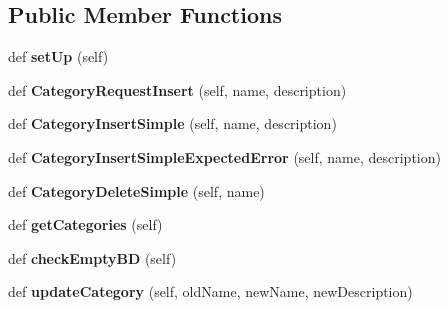 \subsection*{Public Member Functions}
\begin{DoxyCompactItemize}
\item 
def {\bfseries set\+Up} (self)\hypertarget{classRestAPITest_1_1TestCase_ab15a63e1cef5742168755c914f15d523}{}\label{classRestAPITest_1_1TestCase_ab15a63e1cef5742168755c914f15d523}

\item 
def {\bfseries Category\+Request\+Insert} (self, name, description)\hypertarget{classRestAPITest_1_1TestCase_a969723a3a0b1e8c53826b8b66d381ecf}{}\label{classRestAPITest_1_1TestCase_a969723a3a0b1e8c53826b8b66d381ecf}

\item 
def {\bfseries Category\+Insert\+Simple} (self, name, description)\hypertarget{classRestAPITest_1_1TestCase_a4577b04619521115a7fe7beabd2cc4c6}{}\label{classRestAPITest_1_1TestCase_a4577b04619521115a7fe7beabd2cc4c6}

\item 
def {\bfseries Category\+Insert\+Simple\+Expected\+Error} (self, name, description)\hypertarget{classRestAPITest_1_1TestCase_a7eaacb4d1cadafd86a3796c853b910b3}{}\label{classRestAPITest_1_1TestCase_a7eaacb4d1cadafd86a3796c853b910b3}

\item 
def {\bfseries Category\+Delete\+Simple} (self, name)\hypertarget{classRestAPITest_1_1TestCase_a10dfd5e51c8ac3153dd27efba4a6fd44}{}\label{classRestAPITest_1_1TestCase_a10dfd5e51c8ac3153dd27efba4a6fd44}

\item 
def {\bfseries get\+Categories} (self)\hypertarget{classRestAPITest_1_1TestCase_a3b0f3e34610c37926b3aba29263215c3}{}\label{classRestAPITest_1_1TestCase_a3b0f3e34610c37926b3aba29263215c3}

\item 
def {\bfseries check\+Empty\+BD} (self)\hypertarget{classRestAPITest_1_1TestCase_abf0c80f731366e0ea26dffc40a37c2c5}{}\label{classRestAPITest_1_1TestCase_abf0c80f731366e0ea26dffc40a37c2c5}

\item 
def {\bfseries update\+Category} (self, old\+Name, new\+Name, new\+Description)\hypertarget{classRestAPITest_1_1TestCase_a3288d417eff8aa893b604e06f4952582}{}\label{classRestAPITest_1_1TestCase_a3288d417eff8aa893b604e06f4952582}


\end{DoxyCompactItemize}
